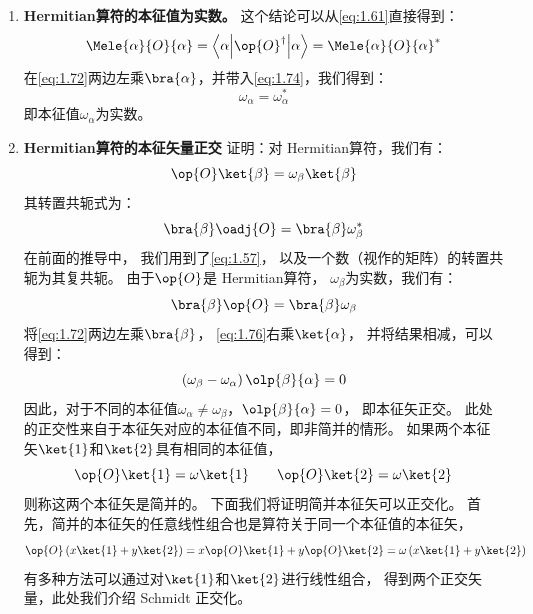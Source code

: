 \begin{enumerate}[]
 \item {\bfseries Hermitian算符的本征值为实数。} 这个结论可以从\autoref{eq:1.61}直接得到：
 \begin{equation}
     \Mele{\alpha}{O}{\alpha} = \left\langle\alpha\middle\vert\op{O}^\dagger\middle\vert\alpha\right\rangle = {\Mele{\alpha}{O}{\alpha}}^\ast
     \label{eq:1.74}
 \end{equation}
 在\autoref{eq:1.72}两边左乘$\bra{\alpha}$，并带入\autoref{eq:1.74}，我们得到：
 \begin{equation}
     \omega_\alpha = \omega_\alpha^\ast
     \label{eq:1.75}
 \end{equation}
 即本征值$\omega_\alpha$为实数。
 
 \item {\bfseries Hermitian算符的本征矢量正交} 证明：对 Hermitian算符，我们有：
 \[\op{O}\ket{\beta} = \omega_\beta \ket{\beta}\]
 其转置共轭式为：
 \[\bra{\beta}\oadj{O} = \bra{\beta}\omega_\beta^\ast\]
 在前面的推导中，
 我们用到了\autoref{eq:1.57}，
 以及一个数（视作的矩阵）的转置共轭为其复共轭。
 由于$\op{O}$是 Hermitian算符，
 $\omega_\beta$为实数，我们有：
 \begin{equation}
     \bra{\beta}\op{O} = \bra{\beta}\omega_\beta
     \label{eq:1.76}
 \end{equation}
 将\autoref{eq:1.72}两边左乘$\bra{\beta}$，
 \autoref{eq:1.76}右乘$\ket{\alpha}$，
 并将结果相减，可以得到：
 \begin{equation}
     \left(\omega_\beta - \omega_\alpha\right)\olp{\beta}{\alpha} = 0
     \label{eq:1.77}
 \end{equation}
 因此，对于不同的本征值$\omega_\alpha \neq \omega_\beta$，$\olp{\beta}{\alpha} = 0$，
 即本征矢正交。
 此处的正交性来自于本征矢对应的本征值不同，即非简并的情形。
 如果两个本征矢$\ket{1}$和$\ket{2}$具有相同的本征值，
 \begin{equation}
     \op{O}\ket{1} = \omega\ket{1} \qquad \op{O}\ket{2} = \omega\ket{2}
     \label{eq:1.78}
 \end{equation}
 则称这两个本征矢是简并的。
 下面我们将证明简并本征矢可以正交化。
 首先，简并的本征矢的任意线性组合也是算符关于同一个本征值的本征矢，
 \begin{equation}
     \op{O}\left(x\ket{1}+y\ket{2}\right) = x\op{O}\ket{1} + y\op{O}\ket{2} = \omega\left(x\ket{1}+y\ket{2}\right)
     \label{eq:1.79}
 \end{equation}
 有多种方法可以通过对$\ket{1}$和$\ket{2}$进行线性组合，
 得到两个正交矢量，此处我们介绍 Schmidt 正交化。

\end{enumerate}
